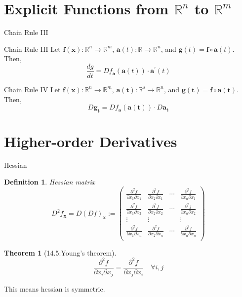 \documentclass[a4paper,11pt]{article}
\newtheorem{defn}{Definition}
\newtheorem{thm}{Theorem}
\newcommand{\bb}{\mathbb}
\newcommand{\bd}{\mathbf}
\newcommand{\p}{\partial}
\begin{document}
\section{Explicit Functions from $\mathbb{R}^n$ to $\mathbb{R}^m$} %
\label{sec:explicit_functions_from_mathbb_r_n_to_mathbb_r_m}
\begin{frame}[t]{Chain Rule III}
	\begin{block}
		{Chain Rule III}
		Let $\bd f(\bd x): \bb{R}^n\rightarrow \bb{R}^m$, $\bd a(t):\bb{R}\rightarrow\bb{R}^n$, and $\bd g(t) = \bd f \circ \bd a (t)$. Then, \[
			\frac{dg}{dt} = Df_{\bd a}(\bd a(t))\cdot \bd a^\prime (t)
		\]
	\end{block}
	\begin{block}
		{Chain Rule IV}
		Let $\bd f(\bd x): \bb{R}^n\rightarrow \bb{R}^m$, $\bd a(\bd t ):\bb{R}^s\rightarrow\bb{R}^n$, and $\bd g(\bd t) = \bd f \circ \bd a (\bd t)$. Then, \[
			{D\bd g}_{\bd t} = {Df}_{\bd a} (\bd a(\bd t))\cdot D\bd a_{\bd t}
		\]
	\end{block}
\end{frame}
\section{Higher-order Derivatives} %
\label{sec:higher_order_derivatives}
\begin{frame}[t]{Hessian}
	\begin{defn}
		{Hessian matrix}\[
			D^2 f_{\bd x} = D(Df)_{\bd x}:=\begin{pmatrix}
				\frac{\p^2 f}{\p x_1 \p x_1} & \frac{\p^2 f}{\p x_2\p x_1} & \cdots & \frac{\p^2 f}{\p x_n \p x_1}\\
				\frac{\p^2 f}{\p x_1 \p x_2} & \frac{\p^2 f}{\p x_2\p x_2} & \cdots & \frac{\p^2 f}{\p x_n \p x_2}\\
				\vdots & \vdots & &\vdots\\
				\frac{\p^2 f}{\p x_1 \p x_n} & \frac{\p^2 f}{\p x_2\p x_n} & \cdots & \frac{\p^2 f}{\p x_n \p x_n}\\
			\end{pmatrix}
		\]
	\end{defn}
	\begin{thm}
		[14.5:Young's theorem]
		\[
			 \frac{\p^2 f}{\p x_i\p x_j} =  \frac{\p^2 f}{\p x_j\p x_i} \quad\forall i,j
		\]
	\end{thm}
	This means hessian is symmetric.
\end{frame}
\end{document}
